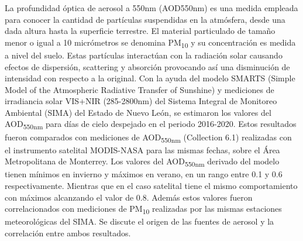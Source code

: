 La profundidad óptica de aerosol a 550nm (AOD550nm) es una medida empleada para conocer la cantidad de
partículas suspendidas en la atmósfera, desde una dada altura hasta la superficie terrestre. El material
particulado de tamaño menor o igual a 10 micrómetros se denomina PM\textsubscript{10} y su concentración es medida a nivel
del suelo. Estas partículas interactúan con la radiación solar causando efectos de dispersión, scattering y
absorción provocando así una disminución de intensidad con respecto a la original. Con la ayuda del modelo SMARTS
(Simple Model of the Atmospheric Radiative Transfer of Sunshine) y mediciones de irradiancia solar VIS+NIR (285-2800nm)
del Sistema Integral de Monitoreo Ambiental (SIMA) del Estado de Nuevo León, se estimaron los valores del
AOD\textsubscript{550nm} para días de cielo despejado en el periodo 2016-2020. Estos resultados fueron comparados
con mediciones de AOD\textsubscript{550nm} (Collection 6.1) realizadas con el instrumento satelital MODIS-NASA
para las mismas fechas, sobre el Área Metropolitana de Monterrey. Los valores del AOD\textsubscript{550nm} derivado
del modelo tienen mínimos en invierno y máximos en verano, en un rango entre 0.1 y 0.6 respectivamente. Mientras que
en el caso satelital tiene el mismo comportamiento con máximos alcanzando el valor de 0.8. Además estos valores fueron
correlacionados con mediciones de PM\textsubscript{10} realizadas por las  mismas estaciones meteorológicas del SIMA. Se discute
el origen de las fuentes de aerosol y la correlación entre ambos resultados.